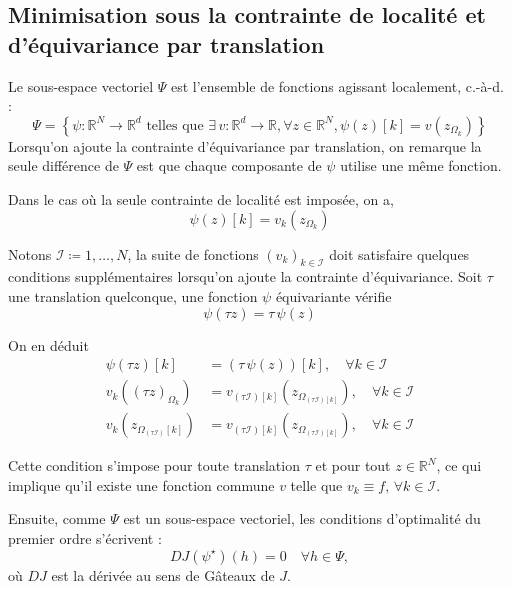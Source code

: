 \documentclass[a4paper,10pt]{article}
\theoremstyle{definition} %
\theoremstyle{definition} %
\theoremstyle{definition} %
\theoremstyle{definition} %
\newcommand{\R}{\mathbb{R}}
\begin{document}
\subsection{Minimisation sous la contrainte de localité et d'équivariance par translation}
Le sous-espace vectoriel $\Psi$ est l'ensemble de fonctions agissant localement, c.-à-d. :
\begin{equation*}
    \Psi = \left\{\psi : \mathbb{R}^N \to \mathbb{R}^d \text{ telles que } \exists\, v : \mathbb{R}^d \to \mathbb{R}, \forall z \in \mathbb{R}^N, \psi(z)[k] = v(z_{\Omega_k})\right\}
\end{equation*}
Lorsqu'on ajoute la contrainte d'équivariance par translation, on remarque la seule différence de $\Psi$ est que chaque composante de $\psi$ utilise une même fonction.

Dans le cas où la seule contrainte de localité est imposée, on a,
\begin{equation*}
    \psi(z)[k] = v_k(z_{\Omega_k})
\end{equation*}

Notons $\mathcal{I} \coloneqq {1, \dots , N}$, la suite de fonctions $(v_k)_{k\in \mathcal{I}}$ doit satisfaire quelques conditions supplémentaires lorsqu'on ajoute la contrainte d'équivariance. Soit $\tau$ une translation quelconque, une fonction $\psi$ équivariante vérifie
\begin{equation*}
    \psi(\tau z) = \tau\,\psi(z)
\end{equation*}

On en déduit
\begin{align*}
    \psi(\tau z)[k] &= (\tau \, \psi(z))[k], \quad \forall k\in\mathcal{I}\\
    v_k ((\tau z)_{\Omega_k}) &= v_{(\tau \mathcal{I})[k]}\left(z_{\Omega_{(\tau \mathcal{I})[k]}}\right), \quad \forall k\in\mathcal{I}\\
    v_k ( z_{\Omega_(\tau \mathcal{I})[k]}) &= v_{(\tau \mathcal{I})[k]}\left(z_{\Omega_{(\tau \mathcal{I})[k]}}\right), \quad \forall k\in\mathcal{I}
\end{align*}

Cette condition s'impose pour toute translation $\tau$ et pour tout $z \in \R^N$, ce qui implique qu'il existe une fonction commune $v$ telle que $v_k \equiv f, \,\forall k\in \mathcal{I}$.

Ensuite, comme $\Psi$ est un sous-espace vectoriel, les conditions d'optimalité du premier ordre s'écrivent :
\begin{equation}
    DJ(\psi^\star)(h) = 0 \quad \forall h \in \Psi,
\end{equation}
où $DJ$ est la dérivée au sens de Gâteaux de $J$.
\end{document}

